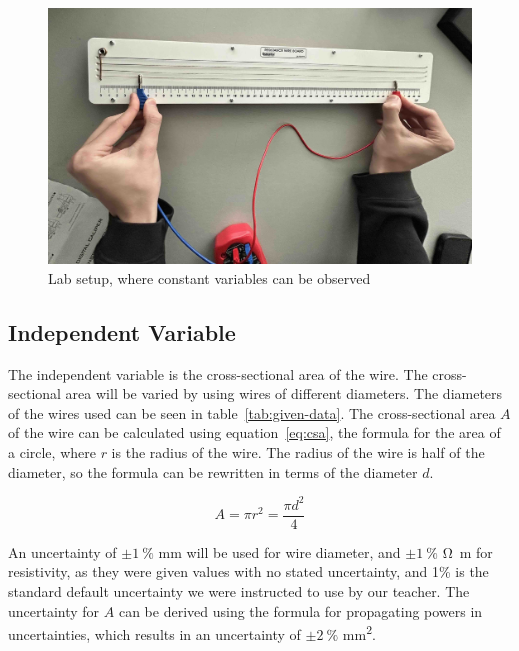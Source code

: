 \documentclass{article}
\newcommand{\punc}[2]{\(\pm\SI{#1}{\percent}\) \si{#2}}
\begin{document}
\begin{figure}[H]
  \medskip
  \centering
  \includegraphics[width=1\linewidth]{lab-setup}
  \caption{Lab setup, where constant variables can be observed}\label{fig:lab-setup}
\end{figure}

\subsection{Independent Variable}

The independent variable is the cross-sectional area of the wire. The cross-sectional area will be varied by using wires of different diameters. The diameters of the wires used can be seen in table~\ref{tab:given-data}. The cross-sectional area \(A\)
of the wire can be calculated using equation~\ref{eq:csa}, the formula for the area of a circle, where \(r\) is the radius of the wire. The radius of the wire is half of the diameter, so the formula can be rewritten in terms of the diameter \(d\).

\begin{equation}\label{eq:csa}
  A = \pi r^2 = \frac{\pi d^2}{4}
\end{equation}

An uncertainty of \punc{1}{\milli\metre} will be used for wire diameter, and \punc{1}{\ohm\metre} for resistivity, as they were given values with no stated uncertainty, and 1\% is the standard default uncertainty we were instructed to use by our teacher. The uncertainty for \(A\) can be derived using the formula for propagating powers in uncertainties, which results in an uncertainty of \punc{2}{\milli\metre\squared}.
\end{document}
